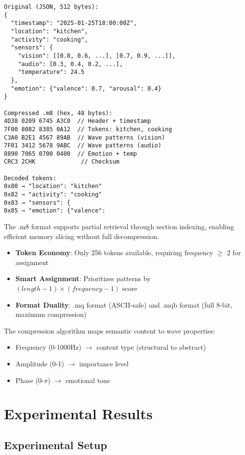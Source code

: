 \documentclass[11pt,letterpaper]{article}
\begin{document}
\begin{footnotesize}
\begin{verbatim}
Original (JSON, 512 bytes):
{
  "timestamp": "2025-01-25T18:00:00Z",
  "location": "kitchen",
  "activity": "cooking",
  "sensors": {
    "vision": [[0.8, 0.6, ...], [0.7, 0.9, ...]],
    "audio": [0.3, 0.4, 0.2, ...],
    "temperature": 24.5
  },
  "emotion": {"valence": 0.7, "arousal": 0.4}
}

Compressed .m8 (hex, 48 bytes):
4D38 0209 6745 A3C0  // Header + timestamp
7F00 8082 8385 0A12  // Tokens: kitchen, cooking
C3A0 B2E1 4567 89AB  // Wave patterns (vision)
7F01 3412 5678 9ABC  // Wave patterns (audio)
8890 7065 0700 0400  // Emotion + temp
CRC3 2CHK             // Checksum

Decoded tokens:
0x80 → "location": "kitchen"
0x82 → "activity": "cooking"
0x83 → "sensors": {
0x85 → "emotion": {"valence":
\end{verbatim}
\end{footnotesize}

The .m8 format supports partial retrieval through section indexing, enabling efficient memory slicing without full decompression.
\begin{itemize}
\item \textbf{Token Economy}: Only 256 tokens available, requiring frequency $\geq$ 2 for assignment
\item \textbf{Smart Assignment}: Prioritizes patterns by $(length - 1) \times (frequency - 1)$ score
\item \textbf{Format Duality}: .mq format (ASCII-safe) and .mqb format (full 8-bit, maximum compression)
\end{itemize}

The compression algorithm maps semantic content to wave properties:
\begin{itemize}
\item Frequency (0-1000Hz) $\rightarrow$ content type (structural to abstract)
\item Amplitude (0-1) $\rightarrow$ importance level
\item Phase (0-$\pi$) $\rightarrow$ emotional tone
\end{itemize}

\section{Experimental Results}

\subsection{Experimental Setup}
\end{document}
